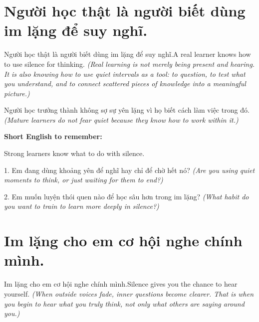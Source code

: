 \section{Người học thật là người biết dùng im lặng để suy nghĩ.}
\begin{truyen}{Người học thật là người biết dùng im lặng để suy nghĩ.}{A real learner knows how to use silence for thinking.}
\textit{(Real learning is not merely being present and hearing. It is also knowing how to use quiet intervals as a tool: to question, to test what you understand, and to connect scattered pieces of knowledge into a meaningful picture.)}
\end{truyen}

\begin{baihoc}
Người học trưởng thành không sợ sự yên lặng vì họ biết cách làm việc trong đó.
\textit{(Mature learners do not fear quiet because they know how to work within it.)}
\end{baihoc}

\begin{ghinhoanh}
\textbf{Short English to remember:}

Strong learners know what to do with silence.

\end{ghinhoanh}

\begin{tuhocnhanh}
1. Em đang dùng khoảng yên để nghĩ hay chỉ để chờ hết nó? \textit{(Are you using quiet moments to think, or just waiting for them to end?)}

2. Em muốn luyện thói quen nào để học sâu hơn trong im lặng? \textit{(What habit do you want to train to learn more deeply in silence?)}
\end{tuhocnhanh}
\ngancach


\section{Im lặng cho em cơ hội nghe chính mình.}
\begin{truyen}{Im lặng cho em cơ hội nghe chính mình.}{Silence gives you the chance to hear yourself.}
\textit{(When outside voices fade, inner questions become clearer. That is when you begin to hear what you truly think, not only what others are saying around you.)}
\end{truyen}

